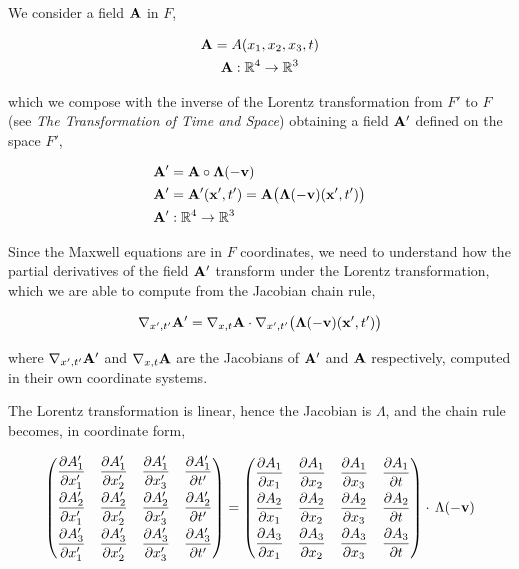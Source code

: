 \documentclass[12pt]{article}
\newcommand{\ds}{\displaystyle}
\begin{document}
We consider a field $\vb{A}$ in $F$,

\[
  \begin{gathered}
    \vb{A} = A(x_1, x_2, x_3, t) \\
    \vb{A}: \mathbb{R}^4 \to \mathbb{R}^3
  \end{gathered}
\]

which we compose with the inverse of the Lorentz transformation from $F'$ to $F$ (see
\textit{The Transformation of Time and Space}) obtaining a field $\vb{A}'$ defined on the
space $F'$,

\begin{align}
  \vb{A}' &= \vb{A} \circ \boldsymbol{\Lambda}(-\vb{v}) \\
  \vb{A}' &= \vb{A}'(\vb{x}', t') = \vb{A}\bigl(\boldsymbol{\Lambda}(-\vb{v})(\vb{x}', t')\bigr) \nonumber \\
  \vb{A}' &: \mathbb{R}^4 \to \mathbb{R}^3 \nonumber
\end{align}

Since the Maxwell equations are in $F$ coordinates, we need to understand how the partial
derivatives of the field $\vb{A}'$ transform under the Lorentz transformation, which we are
able to compute from the Jacobian chain rule,

\[
  \nabla_{x',t'}\vb{A}' = \nabla_{x,t}\vb{A} \cdot \nabla_{x',t'}\bigl(\boldsymbol{\Lambda}(-\vb{v})(\vb{x}',t')\bigr)
\]

where $\nabla_{x',t'}\vb{A}'$ and $\nabla_{x,t}\vb{A}$ are the Jacobians of $\vb{A}'$ and
$\vb{A}$ respectively, computed in their own coordinate systems.

The Lorentz transformation is linear, hence the Jacobian is $\Lambda$, and the chain rule
becomes, in coordinate form,

\[
  \begin{pmatrix}
    \ds\pdv{A'_1}{x'_1} & \ds\pdv{A'_1}{x'_2} & \ds\pdv{A'_1}{x'_3} & \ds\pdv{A'_1}{t'} \\[8pt]
    \ds\pdv{A'_2}{x'_1} & \ds\pdv{A'_2}{x'_2} & \ds\pdv{A'_2}{x'_3} & \ds\pdv{A'_2}{t'} \\[8pt]
    \ds\pdv{A'_3}{x'_1} & \ds\pdv{A'_3}{x'_2} & \ds\pdv{A'_3}{x'_3} & \ds\pdv{A'_3}{t'}
  \end{pmatrix}
  =
  \begin{pmatrix}
    \ds\pdv{A_1}{x_1} & \ds\pdv{A_1}{x_2} & \ds\pdv{A_1}{x_3} & \ds\pdv{A_1}{t} \\[8pt]
    \ds\pdv{A_2}{x_1} & \ds\pdv{A_2}{x_2} & \ds\pdv{A_2}{x_3} & \ds\pdv{A_2}{t} \\[8pt]
    \ds\pdv{A_3}{x_1} & \ds\pdv{A_3}{x_2} & \ds\pdv{A_3}{x_3} & \ds\pdv{A_3}{t}
  \end{pmatrix}
  \cdot\, \Lambda(-\vb{v})
\]
\end{document}
